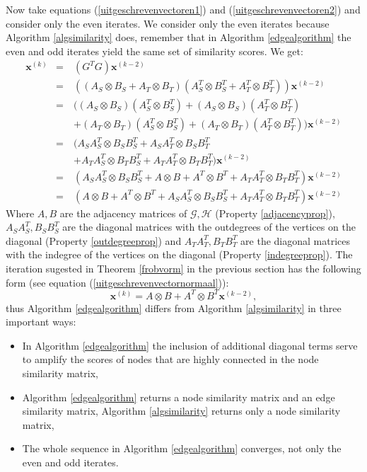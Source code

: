 \documentclass[a4paper,11pt]{report}
\newcommand{\graf}{\mathscr{G}}
\newcommand{\grafeen}{\mathscr{H}}
\begin{document}
Now take equations (\ref{uitgeschrevenvectoren1}) and 
(\ref{uitgeschrevenvectoren2}) and consider only the even iterates. We consider only the even iterates because Algorithm \ref{algsimilarity} does, 
remember that in Algorithm \ref{edgealgorithm} the even and odd iterates yield 
the same set of similarity scores. We get:
\begin{eqnarray*}
  \mathbf{x}^{(k)} &=& (G^TG)\mathbf{x}^{(k-2)}\\
  &=& ((A_S\otimes B_S + A_T \otimes B_T)(A^T_S \otimes B^T_S + A^T_T \otimes 
  B^T_T))\mathbf{x}^{(k-2)}\\
  &=& ((A_S\otimes B_S)(A^T_S \otimes B^T_S) + (A_S\otimes B_S)(A^T_T \otimes 
  B^T_T) \\
  &\quad& + (A_T \otimes B_T)(A^T_S \otimes B^T_S) + (A_T \otimes B_T)(A^T_T \otimes 
  B^T_T))\mathbf{x}^{(k-2)}\\
  &=& (A_S A^T_S \otimes B_SB^T_S + A_SA^T_T \otimes B_SB^T_T \\
  &\quad& + A_TA^T_S \otimes 
  B_TB^T_S + A_TA^T_T\otimes B_TB^T_T)\mathbf{x}^{(k-2)}\\
  &=& (A_S A^T_S \otimes B_SB^T_S + A \otimes B + A^T \otimes B^T + A_TA^T_T\otimes 
  B_TB^T_T)\mathbf{x}^{(k-2)}\\
  &=& (A \otimes B + A^T \otimes B^T + A_S A^T_S \otimes B_SB^T_S + A_TA^T_T\otimes 
  B_TB^T_T)\mathbf{x}^{(k-2)}
\end{eqnarray*}
Where $A, B$ are the adjacency matrices of $\graf, \grafeen$ (Property 
\ref{adjacencyprop}), 
$A_S A^T_S, B_S B^T_S$ are the diagonal matrices with the outdegrees of the vertices 
on the diagonal (Property \ref{outdegreeprop}) and $A_TA^T_T, 
  B_TB^T_T$ are the diagonal matrices with the indegree of the vertices on the 
  diagonal (Property \ref{indegreeprop}). The iteration sugested in Theorem \ref{frobvorm} 
  in the previous section has the following form (see equation 
  (\ref{uitgeschrevenvectornormaal})):
  $$\mathbf{x}^{(k)} = A \otimes B + A^T \otimes B^T\mathbf{x}^{(k-2)},$$
thus Algorithm \ref{edgealgorithm} differs from Algorithm \ref{algsimilarity} in three important ways:
\begin{itemize}
  \item  In Algorithm \ref{edgealgorithm} the inclusion of additional diagonal terms serve to amplify the scores of 
nodes that are highly connected in the node similarity matrix,
\item  Algorithm \ref{edgealgorithm} returns a node similarity matrix and an edge similarity matrix, Algorithm \ref{algsimilarity}
returns only a node similarity matrix,
\item The whole sequence in Algorithm \ref{edgealgorithm} converges, not only 
the even and odd iterates.

\end{itemize}
  
\end{document}
